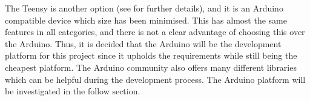 The Teensy is another option (see \cite{TeensyIsDopeMan} for further details), and it is an Arduino compatible  device which size has been minimised.
This has almost the same features in all categories, and there is not a clear advantage of choosing this over the Arduino.
Thus, it is decided that the Arduino will be the development platform for this project since it upholds the requirements while still being the cheapest platform.
The Arduino community also offers many different libraries which can be helpful during the development process.
The Arduino platform will be investigated in the follow section.
